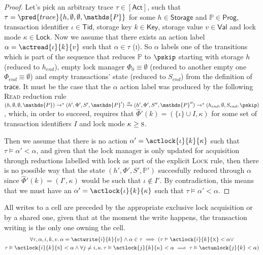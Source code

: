 \begin{proof}
Let's pick an arbitrary trace $\tau \in \mathsf{[Act]}$, such that $\tau = \pred{trace}{h, \emptyset, \emptyset, \mathds{P}}$ for some $h \in \mathsf{Storage}$ and $\mathds{P} \in \mathsf{Prog}$, transaction identifier $\iota \in \mathsf{Tid}$, storage key $k \in \mathsf{Key}$, storage value $v \in \mathsf{Val}$ and lock mode $\kappa \in \mathsf{Lock}$. Now we assume that there exists an action label $\alpha = \actread{\iota}{k}{v}$ such that $\alpha \in \tau$ (\textsc{i}). So $\alpha$ labels one of the transitions which is part of the sequence that reduces $\mathds{P}$ to $\pskip$ starting with storage $h$ (reduced to $h_{end}$), empty lock manager $\Phi_0 \equiv \emptyset$ (reduced to another empty one $\Phi_{end} \equiv \emptyset$) and empty transactions' state (reduced to $S_{end}$) from the definition of $\mathsf{trace}$. It must be the case that the $\alpha$ action label was produced by the following \textsc{Read} reduction rule $(h, \emptyset, \emptyset, \mathds{P}) \rightarrow^* (h', \Phi', S', \mathds{P}') \xrightarrow{\alpha} (h', \Phi', S'', \mathds{P}'') \rightarrow^* (h_{end}, \emptyset, S_{end}, \pskip)$, which, in order to succeed, requires that $\hat{\Phi}'(k) = (\{ \iota \} \cup I, \kappa)$ for some set of transaction identifiers $I$ and lock mode $\kappa \geq \textsc{s}$.

Then we assume that there is no action $\alpha' = \actlock{\iota}{k}{\kappa}$ such that $\tau \vDash \alpha' < \alpha$, and given that the lock manager is only updated for acquisition through reductions labelled with \textsf{lock} as part of the explicit \textsc{Lock} rule, then there is no possible way that the state $(h', \Phi', S', \mathds{P}')$ succesfully reduced through $\alpha$ since $\hat{\Phi}'(k) = (I'
, \kappa)$ would be such that $\iota \not\in I'$. By contradiction, this means that we must have an $\alpha' = \actlock{\iota}{k}{\kappa}$ such that $\tau \vDash \alpha' < \alpha$.
\end{proof}

\lem \label{lem:write} All writes to a cell are preceded by the appropriate exclusive lock acquisition or by a shared one, given that at the moment the write happens, the transaction writing is the only one owning the cell.
\begin{gather*}
\forall \tau, \alpha, i, k, v \ldotp
\alpha = \actwrite{i}{k}{v} \land \alpha \in \tau \implies
(\tau \vDash \actlock{i}{k}{\textsc{x}} < \alpha \lor \\
\tau \vDash \actlock{i}{k}{\textsc{s}} < \alpha \land \forall j \neq i, \kappa \ldotp \tau \vDash \actlock{j}{k}{\kappa} < \alpha \implies \tau \vDash \actunlock{j}{k} < \alpha)
\end{gather*}

